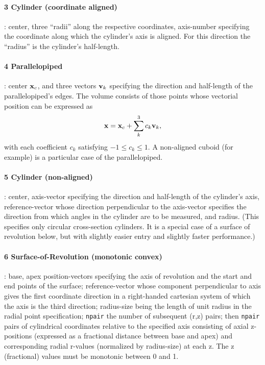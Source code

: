 \documentclass[12pt]{article}
\begin{document}
\paragraph{3 Cylinder (coordinate aligned)}: center, three ``radii''
along the respective coordinates, axis-number specifying the
coordinate along which the cylinder's axis is aligned. For this
direction the ``radius'' is the cylinder's half-length.

\paragraph{4 Parallelopiped}: center ${\bf x}_c$, and three vectors
${\bf v}_k$ specifying the
direction and half-length of the parallelopiped's edges. The volume
consists of those points whose vectorial position can be expressed as
\begin{equation}\label{parallelocoef}
{\bf x} = {\bf x}_c + \sum_k^3 c_k {\bf v}_k,  
\end{equation}
with each coefficient
$c_k$ satisfying $-1\le c_k \le 1$. A non-aligned cuboid (for example)
is a
particular case of the parallelopiped. 

\paragraph{5 Cylinder (non-aligned)}: center, axis-vector specifying the
direction and half-length of the cylinder's axis, reference-vector
whose direction perpendicular to the axis-vector specifies the
direction from which angles in the cylinder are to be measured, and
radius. (This specifies only circular cross-section cylinders. It is a
special case of a surface of revolution below, but with slightly
easier entry and slightly faster performance.)

\paragraph{6 Surface-of-Revolution (monotonic convex)}: base, apex
position-vectors specifying the axis of revolution and the start and
end points of the surface; reference-vector whose component
perpendicular to axis gives the first coordinate direction in a
right-handed cartesian system of which the axis is the third
direction; radius-size being the length of unit radius in the radial
point specification; \verb!npair! the number of subsequent (r,z)
pairs; then \verb!npair! pairs of cylindrical coordinates relative to
the specified axis consisting of axial z-positions (expressed as a
fractional distance between base and apex) and corresponding radial
r-values (normalized by radius-size) at each z. The z (fractional)
values must be monotonic between 0 and 1.
\end{document}
